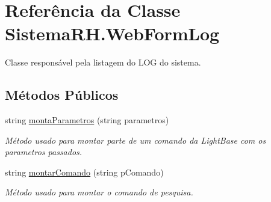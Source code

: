 \hypertarget{class_sistema_r_h_1_1_web_form_log}{
\section{Referência da Classe SistemaRH.WebFormLog}
\label{class_sistema_r_h_1_1_web_form_log}
}


Classe responsável pela listagem do LOG do sistema.  


\subsection*{Métodos Públicos}
\begin{DoxyCompactItemize}
\item 
string \hyperlink{class_sistema_r_h_1_1_web_form_log_ab4219c4b65e3136b76c8dc53ce60a192}{montaParametros} (string parametros)
\begin{DoxyCompactList}\small\item\em Método usado para montar parte de um comando da LightBase com os parametros passados. \item\end{DoxyCompactList}\item 
string \hyperlink{class_sistema_r_h_1_1_web_form_log_afcb5adbb688d05267c369a2f269dd65c}{montarComando} (string pComando)
\begin{DoxyCompactList}\small\item\em Método usado para montar o comando de pesquisa. \item\end{DoxyCompactList}\end{DoxyCompactItemize}

